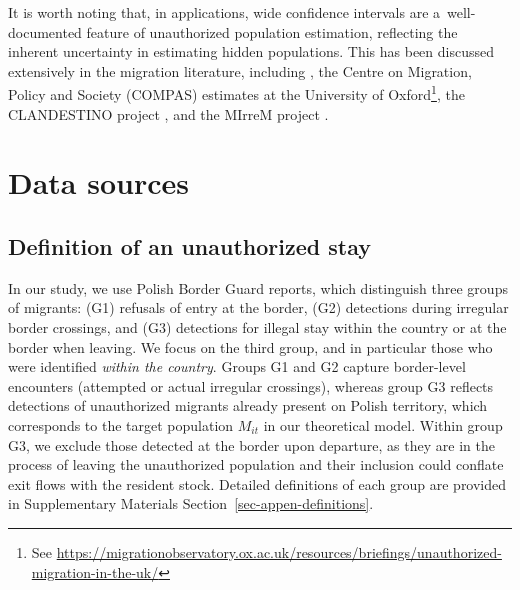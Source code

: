 It is worth noting that, in applications, wide confidence intervals are a~well-documented feature of unauthorized population estimation, reflecting the inherent uncertainty in estimating hidden populations. This has been discussed extensively in the migration literature, including \citet{van2021uncertainty}, the Centre on
Migration, Policy and Society (COMPAS) estimates at the University of Oxford\footnote{See
 \url{https://migrationobservatory.ox.ac.uk/resources/briefings/unauthorized-migration-in-the-uk/}}, the CLANDESTINO project \citep[cf.][]{CLANDESTINO2009}, and the MIrreM project \citep{kierans2025handbook}.



\section{Data sources} \label{sec-data}


\subsection{Definition of an unauthorized
stay}\label{definition-of-an-unauthorized-stay}

In our study, we use Polish Border Guard reports, which distinguish
three groups of migrants: (G1) refusals of entry at the border, (G2)
detections during irregular border crossings, and (G3) detections for
illegal stay within the country or at the border when leaving. We focus
on the third group, and in particular those who were identified
\emph{within the country}. Groups G1 and G2 capture border-level
encounters (attempted or actual irregular crossings), whereas group G3
reflects detections of unauthorized migrants already present on Polish
territory, which corresponds to the target population $M_{it}$ in our
theoretical model. Within group G3, we exclude those detected at the
border upon departure, as they are in the process of leaving the
unauthorized population and their inclusion could conflate exit flows
with the resident stock. Detailed definitions of each group are provided
in Supplementary Materials Section~\ref{sec-appen-definitions}.

